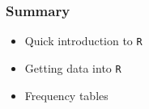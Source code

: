 \documentclass[handout]{beamer}\usepackage[]{graphicx}\usepackage[]{color}
\begin{document}
\begin{frame}[fragile]
  \frametitle{Summary}
  \begin{itemize}
  \item Quick introduction to \texttt{R}
  \item Getting data into \texttt{R}
  \item Frequency tables
  \end{itemize}
\end{frame}
\end{document}
